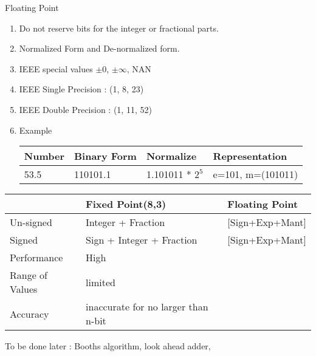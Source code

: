 \begin{enumerate}
\begin{minipage}{\linewidth}
    \item Floating Point
    \begin{enumerate}
        \item Do not reserve bits for the integer or fractional parts.
        \item Normalized Form and De-normalized form.
        \item IEEE special values \( \pm 0\), \( \pm \infty \), NAN
        \item IEEE Single Precision : (1, 8, 23)
        \item IEEE Double Precision : (1, 11, 52)
        \item Example \\
        \begin{myTableStyle} \begin{tabular}{ |m{2cm}|m{3cm}|m{3cm}|m{2.5cm}| } \hline
            Number & Binary Form  &  Normalize &  Representation  \\ \hline
            53.5   & 110101.1     &  1.101011 * \(2^5\) &  e=101, m=(101011)  \\ \hline
        \end{tabular} \end{myTableStyle} \vspace{0.08in}
    \end{enumerate}

    \begin{myTableStyle} \begin{tabular}{ |m{2cm}|m{6cm}|m{6cm}| } \hline
                            &   Fixed Point(8,3)            & Floating Point            \\ \hline
        Un-signed           &   Integer + Fraction          & [Sign+Exp+Mant]    \\ \hline
        Signed              &   Sign + Integer + Fraction   & [Sign+Exp+Mant]    \\ \hline
        Performance         &   High                        & \\ \hline
        Range of Values     &   limited                     & \\ \hline
        Accuracy            &   inaccurate for no larger than n-bit  &  \\ \hline
    \end{tabular} \end{myTableStyle} \vspace{0.08in}

    \end{minipage}

    \item To be done later :  Booths algorithm, look ahead adder,

\end{enumerate}
